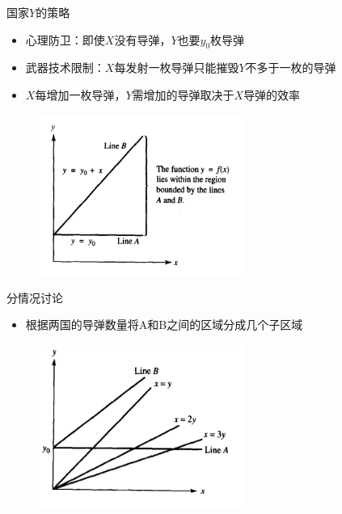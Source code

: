 \documentclass[mathserif, table]{beamer}
\begin{document}
\begin{frame}{国家$Y$的策略}
  \begin{itemize}
  \item 心理防卫：即使$X$没有导弹，$Y$也要$y_0$枚导弹
  \item 武器技术限制：$X$每发射一枚导弹只能摧毁$Y$不多于一枚的导弹
  \item $X$每增加一枚导弹，$Y$需增加的导弹取决于$X$导弹的效率
  \end{itemize}
  
  \begin{figure}
    \centering
    \includegraphics[width=0.6\textwidth]{region.png}
  \end{figure}
\end{frame}

\begin{frame}{分情况讨论}
  \begin{itemize}
  \item 根据两国的导弹数量将A和B之间的区域分成几个子区域
  \end{itemize}
  
  \begin{figure}
    \centering
    \includegraphics[width=0.6\textwidth]{case.png}
  \end{figure}
\end{frame}
\end{document}
